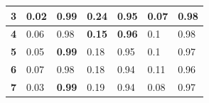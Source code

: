 \begin{table}[h!]
\begin{tabular}{|l|l|l|l|l|l|l|}
\textbf{3}                                                         & \textbf{0.02}                                                             & \textbf{0.99}                                                              & 0.24                                                                   & 0.95                                                                    & 0.07                                                               & 0.98                                                                \\ \hline
\textbf{4}                                                         & 0.06                                                                      & 0.98                                                                       & \textbf{0.15}                                                          & \textbf{0.96}                                                           & 0.1                                                                & 0.98                                                                \\ \hline
\textbf{5}                                                         & 0.05                                                                      & \textbf{0.99}                                                              & 0.18                                                                   & 0.95                                                                    & 0.1                                                                & 0.97                                                                \\ \hline
\textbf{6}                                                         & 0.07                                                                      & 0.98                                                                       & 0.18                                                                   & 0.94                                                                    & 0.11                                                               & 0.96                                                                \\ \hline
\textbf{7}                                                         & 0.03                                                                      & \textbf{0.99}                                                              & 0.19                                                                   & 0.94                                                                    & 0.08                                                               & 0.97                                                                \\ \hline

\end{tabular}
\end{table}
